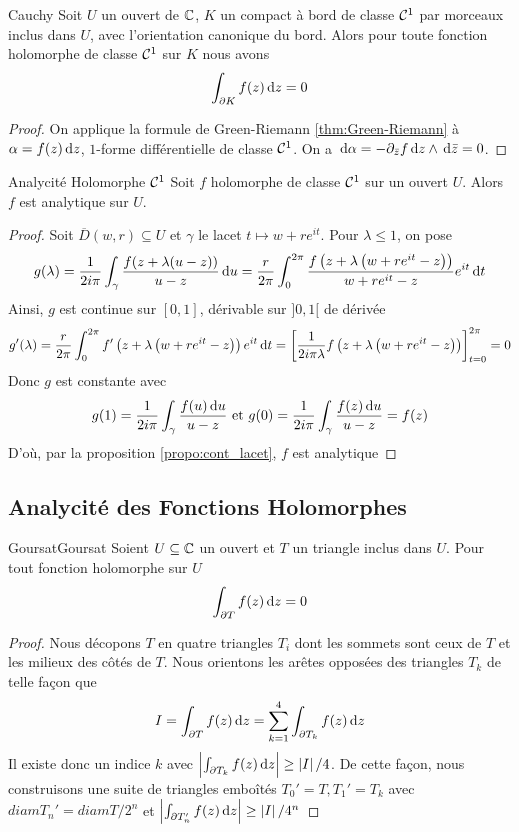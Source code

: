 \documentclass{cours}
\begin{document}
\begin{théorème}{Cauchy}{}
    Soit $U$ un ouvert de $\mathbb{C}$, $K$ un compact à bord de classe $\mathcal{C}^{1}$ par morceaux inclus dans $U$, avec l'orientation canonique du bord. Alors pour toute fonction holomorphe de classe $\mathcal{C}^{1}$ sur $K$ nous avons 
    \[
        \int_{\partial K}f(z){\rm \, d} z = 0
    \]
\end{théorème}
\begin{proof}
    On applique la formule de Green-Riemann \ref{thm:Green-Riemann} à $\alpha = f(z){\rm \, d} z$, $1$-forme différentielle de classe $\mathcal{C}^{1}$. On a ${\rm \, d} \alpha = -\partial_{\bar{z}}f{\rm \, d} z \land {\rm \, d} \bar{z} = 0$.
\end{proof}
\begin{corollaire}{Analycité Holomorphe $\mathcal{C}^{1}$}{}
    Soit $f$ holomorphe de classe $\mathcal{C}^{1}$ sur un ouvert $U$. Alors $f$ est analytique sur $U$. 
\end{corollaire}
\begin{proof}
    Soit $\overline{D}(w, r) \subseteq U$ et $\gamma$ le lacet $t \mapsto w + re^{it}$. Pour $\lambda \leq 1$, on pose
    \[
        g(\lambda) = \frac{1}{2i\pi}\int_{\gamma}\frac{f(z + \lambda(u - z))}{u - z} {\rm \, d} u = \frac{r}{2\pi}\int_{0}^{2\pi}\frac{f\left(z +\lambda\left(w + re^{it} - z\right)\right)}{w + re^{it} - z}e^{it}{\rm \, d} t
    \]
    Ainsi, $g$ est continue sur $[0, 1]$, dérivable sur $]0, 1[$ de dérivée 
    \[
        g'(\lambda) = \frac{r}{2\pi}\int_{0}^{2\pi}f'\left(z + \lambda\left(w + re^{it} - z\right)\right)e^{it}{\rm \, d} t = \left[\frac{1}{2i\pi\lambda}f\left(z + \lambda\left(w + re^{it} - z\right)\right)\right]_{t = 0}^{2\pi} = 0
    \]
    Donc $g$ est constante avec 
    \[
        g(1) = \frac{1}{2i\pi}\int_{\gamma}^{}\frac{f(u){\rm \, d} u}{u - z} \text{ et } g(0) = \frac{1}{2i\pi}\int_{\gamma}\frac{f(z){\rm \, d} u}{u - z} = f(z)
    \]
    D'où, par la proposition \ref{propo:cont_lacet}, $f$ est analytique 
\end{proof}
\subsection{Analycité des Fonctions Holomorphes}
\begin{lemme}{Goursat}{Goursat}
    Soient $U \subseteq \mathbb{C}$ un ouvert et $T$ un triangle inclus dans $U$. Pour tout fonction holomorphe sur $U$
    \[
        \int_{\partial T}f(z){\rm \, d} z = 0
    \]
\end{lemme}
\begin{proof}
    Nous décopons $T$ en quatre triangles $T_{i}$ dont les sommets sont ceux de $T$ et les milieux des côtés de $T$. Nous orientons les arêtes opposées des triangles $T_{k}$ de telle façon que 
    \[
        I = \int_{\partial T}f(z){\rm \, d} z = \sum_{k = 1}^{4}\int_{\partial T_{k}}f(z){\rm \, d} z
    \]
    Il existe donc un indice $k$ avec $\left|\int_{\partial T_{k}}f(z){\rm \, d} z\right| \geq \left|I\right|/4$. De cette façon, nous construisons une suite de triangles emboîtés $T_{0}' = T, T_{1}' = T_{k}$ avec $diam T_{n}' = diam T/2^{n}$ et $\left|\int_{\partial T_{n}'} f(z){\rm \, d} z\right| \geq \left|I\right|/4^{n}$
\end{proof}
\end{document}
